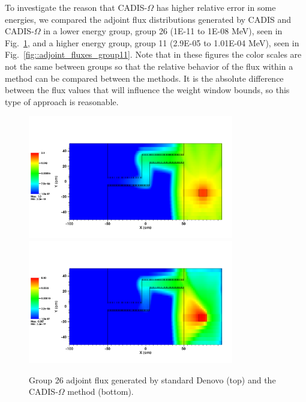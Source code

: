 \documentclass[12pt]{article}
\begin{document}
To investigate the reason that CADIS-$\Omega$ has higher relative error in some energies, we compared the adjoint flux distributions generated by CADIS and CADIS-$\Omega$ in a lower energy group, group 26 (1E-11 to 1E-08 MeV), seen in Fig.~\ref{fig::adjoint_fluxes_group26}, and a higher energy group, group 11 (2.9E-05 to 1.01E-04 MeV), seen in Fig.~\ref{fig::adjoint_fluxes_group11}.
Note that in these figures the color scales are not the same between groups so that the relative behavior of the flux within a method can be compared between the methods. It is the absolute difference between the flux values that will influence the weight window bounds, so this type of approach is reasonable. 

\begin{figure}
  \begin{center}
    \includegraphics[width=0.80\textwidth]{./images/maze2_adjoint_group26_adjusted_update.png}
    \includegraphics[width=0.80\textwidth]{./images/maze2_myflux_group26_adjusted_update.png}
    \caption[]{\label{fig::adjoint_fluxes_group26} Group 26 adjoint flux generated by standard Denovo (top) and the CADIS-$\Omega$ method (bottom).}
  \end{center}
\end{figure}
\end{document}
